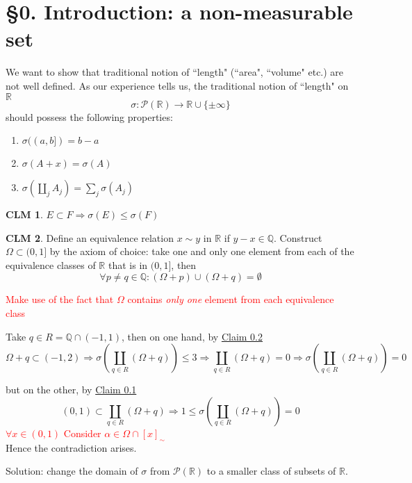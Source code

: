 \documentclass[hidelinks]{article}
\theoremstyle{definition}
\theoremstyle{dotless}
\newtheorem{claim}{CLM}[section]
\theoremstyle{remark}
\begin{document}
\section*{\S0. Introduction: a non-measurable set}
\setcounter{section}{0}

We want to show that traditional notion of ``length" (``area", ``volume" etc.) are not well defined. \bigbreak
As our experience tells us, the traditional notion of ``length" on $\mathbb{R}$
\[
\sigma: \mathscr{P}(\mathbb{R})\to \mathbb{R}\cup\{\pm\infty\}
\]
should possess the following properties:
\begin{enumerate}[label=\arabic*\degree]
    \item $\sigma((a,b])=b-a$
    \item $\sigma(A+x)=\sigma(A)$
    \item $\sigma(\coprod\limits_jA_j)=\sum\limits_j\sigma(A_j)$
\end{enumerate}

\begin{claim}\label{CLM 0.1}
$E\subset F\Rightarrow \sigma(E)\leq \sigma(F)$
\end{claim}

\begin{claim}\label{CLM 0.2}
Define an equivalence relation $x\sim y$ in $\mathbb{R}$ if $y-x\in \mathbb{Q}$. Construct $\Omega\subset (0,1]$ by the axiom of choice: take one and only one element from each of the equivalence classes of $\mathbb{R}$ that is in $(0,1]$, then
\[\forall p\neq q\in \mathbb{Q}:(\Omega+p)\cup(\Omega+q)=\emptyset\]
\end{claim}
\textcolor{red}{Make use of the fact that $\Omega$ contains \emph{only one} element from each equivalence class}\bigbreak

Take $q\in R=\mathbb{Q}\cap(-1,1)$, then on one hand, by \hyperref[CLM 0.2]{Claim 0.2}
\[\Omega +q\subset(-1,2)\Rightarrow\sigma(\coprod_{q\in R}(\Omega+q))\leq 3\Rightarrow\coprod_{q\in R}(\Omega+q)=0\Rightarrow\sigma(\coprod_{q\in R}(\Omega+q))=0\]

but on the other, by \hyperref[CLM 0.1]{Claim 0.1}
\[(0,1)\subset\coprod_{q\in R}(\Omega+q)\Rightarrow 1\leq\sigma(\coprod_{q\in R}(\Omega+q))=0\]
\textcolor{red}{$\forall x\in (0,1)$ Consider $\alpha\in\Omega\cap[x]_\sim$}\\
Hence the contradiction arises. \bigbreak

Solution: change the domain of $\sigma$ from $\mathscr{P}(\mathbb{R})$ to a smaller class of subsets of $\mathbb{R}$.
\end{document}

